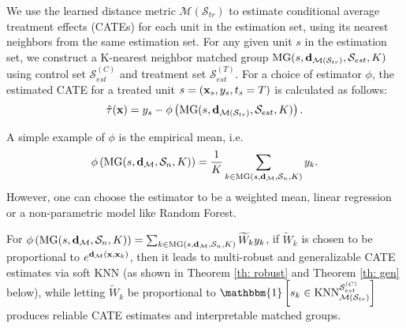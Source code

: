 
We use the learned distance metric $\mathcal{M}(\mathcal{S}_{tr})$ to estimate conditional average treatment effects (CATEs) for each unit in the estimation set, using its nearest neighbors from the same estimation set. For any given unit $s$ in the estimation set, we construct a K-nearest neighbor matched group $\mathrm{MG}(s,\mathbf{d}_{\mathcal{M}(\mathcal{S}_{tr})},\mathcal{S}_{est},K)$ using control set $\mathcal{S}^{(C)}_{est}$ and treatment set $\mathcal{S}^{(T)}_{est}$. For a choice of estimator $\phi$, the estimated CATE for a treated unit $s = (\mathbf{x}_s,y_s,t_s=T)$ is calculated as follows: 
$$\hat{\tau}(\mathbf{x}) = y_s - \phi
\left(\mathrm{MG}(s,\mathbf{d}_{\mathcal{M}(\mathcal{S}_{tr})},\mathcal{S}_{est},K)\right).$$

A simple example of $\phi$ is the empirical mean, i.e. $$\phi\left(\mathrm{MG}(s,\mathbf{d}_{\mathcal{M}},\mathcal{S}_n,K)\right)=\frac{1}{K}\sum_{k\in\mathrm{MG}(s,\mathbf{d}_{\mathcal{M}},\mathcal{S}_n,K)}y_k.$$ However, one can choose the estimator to be a weighted mean, linear regression or a non-parametric model like Random Forest.

For $\phi\left(\mathrm{MG}(s,\mathbf{d}_{\mathcal{M}},\mathcal{S}_n,K)\right) = \sum_{k\in\mathrm{MG}(s,\mathbf{d}_{\mathcal{M}},\mathcal{S}_n,K)} \widetilde{W}_{k}y_k$, if $\widetilde{W}_{k}$ is chosen to be proportional to $e^{\mathbf{d}_{\mathcal{M}}(\mathbf{x},\mathbf{x}_k)}$, then it leads to multi-robust and generalizable CATE estimates via soft KNN (as shown in Theorem \ref{th: robust} and Theorem \ref{th: gen} below), while letting $\widetilde{W}_k$ be proportional to $\mathbbm{1}\left[s_k\in\textrm{KNN}^{\mathcal{S}^{(C)}_{est}}_{\mathcal{M}(\mathcal{S}_{tr})}\right]$ produces reliable CATE estimates and interpretable matched groups.



